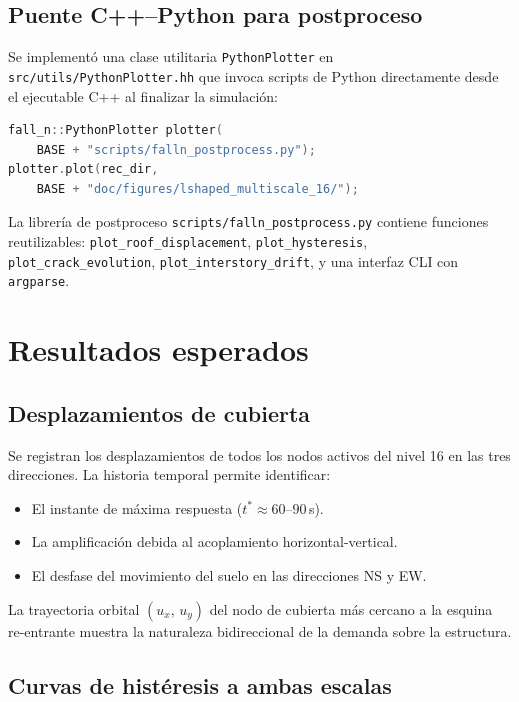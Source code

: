 \subsection{Puente C++--Python para postproceso}

Se implementó una clase utilitaria \texttt{PythonPlotter} en
\texttt{src/utils/PythonPlotter.hh} que invoca scripts de Python
directamente desde el ejecutable C++ al finalizar la simulación:

\begin{lstlisting}[language=C++,
  caption={Invocación de Python desde C++ para generación de figuras.}]
fall_n::PythonPlotter plotter(
    BASE + "scripts/falln_postprocess.py");
plotter.plot(rec_dir,
    BASE + "doc/figures/lshaped_multiscale_16/");
\end{lstlisting}

La librería de postproceso \texttt{scripts/falln\_postprocess.py}
contiene funciones reutilizables:
\texttt{plot\_roof\_displacement},
\texttt{plot\_hysteresis},
\texttt{plot\_crack\_evolution},
\texttt{plot\_interstory\_drift}, y una interfaz CLI con
\texttt{argparse}.


\section{Resultados esperados}
\label{sec:ms16-results}

\subsection{Desplazamientos de cubierta}

Se registran los desplazamientos de todos los nodos activos del
nivel 16 en las tres direcciones.  La historia temporal permite
identificar:
\begin{itemize}
  \item El instante de máxima respuesta ($t^* \approx 60$--$90$\,s).
  \item La amplificación debida al acoplamiento horizontal-vertical.
  \item El desfase del movimiento del suelo en las direcciones NS y EW.
\end{itemize}

La trayectoria orbital $(u_x,\,u_y)$ del nodo de cubierta más cercano
a la esquina re-entrante muestra la naturaleza bidireccional de la
demanda sobre la estructura.

\subsection{Curvas de histéresis a ambas escalas}

